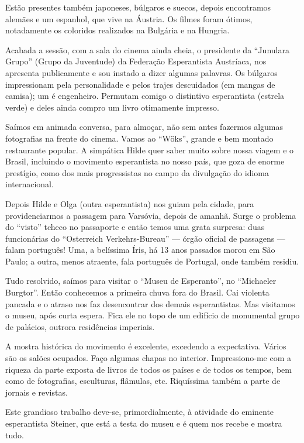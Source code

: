 Estão presentes também japoneses, búlgaros e suecos, depois encontramos alemães e um espanhol, que vive na Áustria. Os filmes foram ótimos, notadamente os coloridos realizados na Bulgária e na Hungria.

Acabada a sessão, com a sala do cinema ainda cheia, o presidente da ``Junulara Grupo'' (Grupo da Juventude) da Federação Esperantista Austríaca, nos apresenta publicamente e sou instado a dizer algumas palavras. Os búlgaros impressionam pela personalidade e pelos trajes descuidados (em mangas de camisa); um é engenheiro. Permutam comigo o distintivo esperantista (estrela verde) e deles ainda compro um livro otimamente impresso.

Saímos em animada conversa, para almoçar, não sem antes fazermos algumas fotografias na frente do cinema. Vamos ao ``Wöks'', grande e bem montado restaurante popular. A simpática Hilde quer saber muito sobre nossa viagem e o Brasil, incluindo o movimento esperantista no nosso país, que goza de enorme prestígio, como dos mais progressistas no campo da divulgação do idioma internacional.

Depois Hilde e Olga (outra esperantista) nos guiam pela cidade, para providenciarmos a passagem para Varsóvia, depois de amanhã. Surge o problema do ``visto'' tcheco no passaporte e então temos uma grata surpresa: duas funcionárias do ``Osterreich Verkehrs-Bureau'' --- órgão oficial de passagens --- falam português! Uma, a belíssima Íris, há 13 anos passados morou em São Paulo; a outra, menos atraente, fala português de Portugal, onde também residiu.

Tudo resolvido, saímos para visitar o ``Museu de Esperanto'', no ``Michaeler Burgtor''. Então conhecemos a primeira chuva fora do Brasil. Cai violenta pancada e o atraso nos faz desencontrar dos demais esperantistas. Mas visitamos o museu, após curta espera. Fica ele no topo de um edifício de monumental grupo de palácios, outrora residências imperiais.

A mostra histórica do movimento é excelente, excedendo a expectativa. Vários são os salões ocupados. Faço algumas chapas no interior. Impressiono-me com a riqueza da parte exposta de livros de todos os países e de todos os tempos, bem como de fotografias, esculturas, flâmulas, etc. Riquíssima também a parte de jornais e revistas.

Este grandioso trabalho deve-se, primordialmente, à atividade do eminente esperantista Steiner, que está a testa do museu e é quem nos recebe e mostra tudo.

